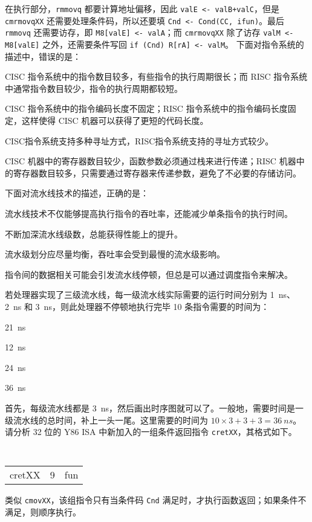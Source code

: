 \begin{problems}
        在执行部分，\verb|rmmovq| 都要计算地址偏移，因此 \verb|valE <- valB+valC|，但是 \verb|cmrmovqXX| 还需要处理条件码，所以还要填 \verb|Cnd <- Cond(CC, ifun)|。最后 \verb|rmmovq| 还需要访存，即 \verb|M8[valE] <- valA|；而 \verb|cmrmovqXX| 除了访存 \verb|valM <- M8[valE]| 之外，还需要条件写回 \verb|if (Cnd) R[rA] <- valM|。
         下面对指令系统的描述中，错误的是：
        \begin{choices}
            \item CISC 指令系统中的指令数目较多，有些指令的执行周期很长；而 RISC 指令系统中通常指令数目较少，指令的执行周期都较短。
            \item CISC 指令系统中的指令编码长度不固定；RISC 指令系统中的指令编码长度固定，这样使得 CISC 机器可以获得了更短的代码长度。
            \item CISC指令系统支持多种寻址方式，RISC指令系统支持的寻址方式较少。
            \item CISC 机器中的寄存器数目较少，函数参数必须通过栈来进行传递；RISC 机器中的寄存器数目较多，只需要通过寄存器来传递参数，避免了不必要的存储访问。
        \end{choices}
         下面对流水线技术的描述，正确的是：
        \begin{choices}
            \item 流水线技术不仅能够提高执行指令的吞吐率，还能减少单条指令的执行时间。
            \item 不断加深流水线级数，总能获得性能上的提升。
            \item 流水级划分应尽量均衡，吞吐率会受到最慢的流水级影响。
            \item 指令间的数据相关可能会引发流水线停顿，但总是可以通过调度指令来解决。
        \end{choices}
         若处理器实现了三级流水线，每一级流水线实际需要的运行时间分别为 \SI{1}{ns}、\SI{2}{ns} 和 \SI{3}{ns}，则此处理器不停顿地执行完毕 10 条指令需要的时间为：
        \begin{choices}
            \item \SI{21}{ns}
            \item \SI{12}{ns}
            \item \SI{24}{ns}
            \item \SI{36}{ns}
        \end{choices}
        \sol 首先，每级流水线都是 \SI{3}{ns}，然后画出时序图就可以了。一般地，需要时间是一级流水线的总时间，补上一头一尾。这里需要的时间为 $10 \times 3+3+3 = \SI{36}{ns}$。
         请分析 32 位的 Y86 ISA 中新加入的一组条件返回指令 \verb|cretXX|，其格式如下。
        \begin{table}[H]
            \tt
            \centering
            \begin{tabular}{c|c|c|}
                \cline{2-3}
                cretXX & 9 & fun \\ \cline{2-3} 
            \end{tabular}
        \end{table}
        类似 \verb|cmovXX|，该组指令只有当条件码 \verb|Cnd| 满足时，才执行函数返回；如果条件不满足，则顺序执行。


\end{problems}
